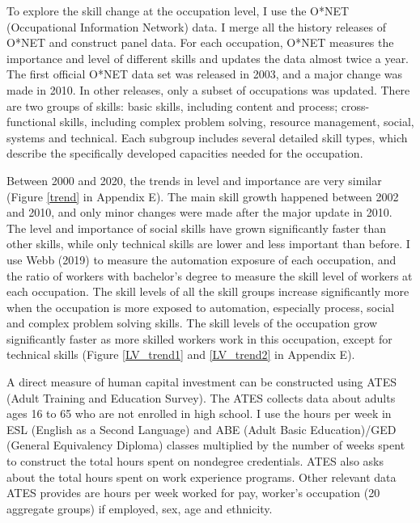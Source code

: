 \documentclass[12pt]{article}
\begin{document}
To explore the skill change at the occupation level, I use the O*NET (Occupational Information Network) data. I merge all the history releases of O*NET and construct panel data. For each occupation, O*NET measures the importance and level of different skills and updates the data almost twice a year. The first official O*NET data set was released in 2003, and a major change was made in 2010. In other releases, only a subset of occupations was updated. There are two groups of skills: basic skills, including content and process; cross-functional skills, including complex problem solving, resource management, social, systems and technical. Each subgroup includes several detailed skill types, which describe the specifically developed capacities needed for the occupation. 

Between 2000 and 2020, the trends in level and importance are very similar (Figure \ref{trend} in Appendix E). The main skill growth happened between 2002 and 2010, and only minor changes were made after the major update in 2010. The level and importance of social skills have grown significantly faster than other skills, while only technical skills are lower and less important than before.  I use Webb (2019)\nocite{Webb2019} to measure the automation exposure of each occupation, and the ratio of workers with bachelor's degree to measure the skill level of workers at each occupation. The skill levels of all the skill groups increase significantly more when the occupation is more exposed to automation, especially process, social and complex problem solving skills. The skill levels of the occupation grow significantly faster as more skilled workers work in this occupation, except for technical skills (Figure \ref{LV_trend1} and \ref{LV_trend2} in Appendix E).

A direct measure of human capital investment can be constructed using ATES (Adult Training and Education Survey). The ATES collects data about adults ages 16 to 65 who are not enrolled in high school. I use the hours per week in ESL (English as a Second Language) and ABE (Adult Basic Education)/GED (General Equivalency Diploma) classes multiplied by the number of weeks spent to construct the total hours spent on nondegree credentials. ATES also asks about the total hours spent on work experience programs. Other relevant data ATES provides are hours per week worked for pay, worker's occupation (20 aggregate groups) if employed, sex, age and ethnicity. 
\end{document}
